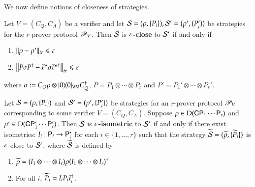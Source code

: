 We now define notions of closeness of strategies. 
%

\begin{definition}
	Let $V = (C_Q,C_A)$ be a verifier and let $\mathcal{S} = (\rho,\{P_i\}), \mathcal{S}' = (\rho',(P_i'))$ be strategies for the $r$-prover protocol $\mathscr{P}_V$. Then $\mathcal{S}$ is \textbf{$\varepsilon$-close} to $\mathcal{S}'$ if and only if
	\begin{enumerate}
		\item $ \lVert \rho - \rho'\rVert_{tr} \leqslant \varepsilon$
		\item $\left\lVert P \sigma P^\dagger - P' \sigma P'^\dagger \right\rVert_{tr} \leqslant \varepsilon$		
		
	\end{enumerate}
where $\sigma := C_Q \rho \otimes |0\rangle\! \langle 0|_{{\mathsf{V}} {\mathsf{M}}} C_Q^\dagger$, $P = P_1 \otimes \cdots \otimes P_r$ and $P' = P_1' \otimes \cdots \otimes P_r'$.

\end{definition}

\begin{definition}
	Let $\mathcal{S} = (\rho,\{P_i\})$ and $\mathcal{S}' = (\rho',\{P_i'\})$ be strategies for an $r$-prover protocol $\mathscr{P}_V$ corresponding to some verifier $V = (C_Q,C_A)$. Suppose $\rho \in \mathrm{D}({\mathsf{C}} {\mathsf{P}}_1 \cdots {\mathsf{P}}_r)$ and $\rho' \in \mathrm{D}({\mathsf{C}} {\mathsf{P}}_1' \cdots {\mathsf{P}}_r')$. Then $\mathcal{S}$ is \textbf{$\varepsilon$-isometric} to $\mathcal{S}'$ if and only if there exist isometries: $I_i : {\mathsf{P}}_i \to {\mathsf{P}}_i'$ for each $i\in\{1,\ldots,r\}$ such that the strategy $\widetilde{\mathcal{S}} = (\widetilde{\rho}, \{ \widetilde{P}_i \})$ is $\varepsilon$-close to $\mathcal{S}'$, where $\widetilde{\mathcal{S}}$ is defined by
	\begin{enumerate}
		\item $\widetilde{\rho} = (I_1 \otimes \cdots \otimes I_r) \rho (I_1 \otimes \cdots \otimes I_r)^\dagger$
		\item For all $i$, $\widetilde{P}_i = I_i P_i I_i^\dagger$.
	\end{enumerate}
\end{definition}


